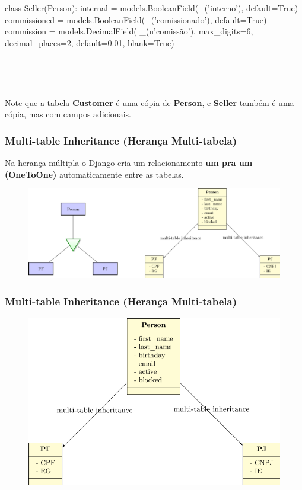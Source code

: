 \documentclass{beamer}
\begin{document}
{\begin{frame}[fragile]
\begin{pythoncode}
class Seller(Person):
    internal = models.BooleanField(_('interno'), default=True)
    commissioned = models.BooleanField(_('comissionado'), default=True)
    commission = models.DecimalField(
        _(u'comissão'), max_digits=6, decimal_places=2, default=0.01, blank=True)
\end{pythoncode}

\

\

Note que a tabela \textbf{Customer} é uma cópia de \textbf{Person}, e \textbf{Seller} também é uma cópia, mas com campos adicionais.
\end{frame}



\begin{frame}\frametitle{Multi-table Inheritance (Herança Multi-tabela)}
    
Na herança múltipla o Django cria um relacionamento \textbf{um pra um (OneToOne)} automaticamente entre as tabelas.

    \begin{figure}[h]
      \centering
        \includegraphics[width=.93\paperwidth]{img/06multitable}
    \end{figure}

\end{frame}

\begin{frame}\frametitle{Multi-table Inheritance (Herança Multi-tabela)}
	
	\begin{figure}[h]
	  \centering
  		\includegraphics[height=.8\paperheight]{img/061multitable}
	\end{figure}


\end{frame}}
\end{document}
